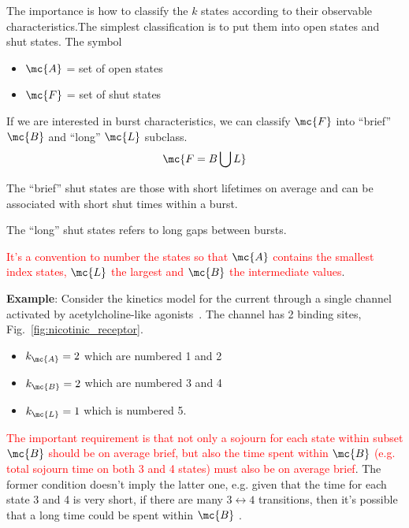 The importance is how to classify the $k$ states according to their
observable characteristics.The simplest classification is to put them
into open states and shut states. The symbol
\begin{itemize}
\item  $\mc{A}$ = set of open states
\item $\mc{F}$ = set of shut states
\end{itemize}
If we are interested in burst characteristics, we can classify
$\mc{F}$ into ``brief'' $\mc{B}$ and ``long'' $\mc{L}$ subclass.
\begin{equation}
  \label{eq:878}
  \mc{F = B \bigcup L}
\end{equation}
\begin{framed}
  The ``brief'' shut states are those with short lifetimes on average
  and can be associated with short shut times within a burst.

  The ``long'' shut states refers to long gaps between bursts.
\end{framed}

\textcolor{red}{It's a convention to number the states so that
  $\mc{A}$ contains the smallest index states,
  $\mc{L}$ the largest and $\mc{B}$ the intermediate values}.

{\bf Example}: Consider the kinetics model for the current through a
single channel activated by acetylcholine-like
agonists~\citep{colquhoun1985fes}. The channel has 2 binding sites,
Fig.~\ref{fig:nicotinic_receptor}.
\begin{itemize}
\item $k_\mc{A}=2$ which are numbered 1 and 2
\item $k_\mc{B}=2$ which are numbered 3 and 4
\item $k_\mc{L}=1$ which is numbered 5.
\end{itemize}
\textcolor{red}{The important requirement is that not only a sojourn
  for each state within subset $\mc{B}$ should be on average brief,
  but also the time spent within $\mc{B}$ (e.g. total sojourn time on
  both 3 and 4 states) must also be on average brief}.
The former condition doesn't imply the latter one, e.g. given that the
time for each state 3 and 4 is very short, if there are many
$3\leftrightarrow 4$ transitions, then it's possible that a long time
could be spent within $\mc{B}$ .

